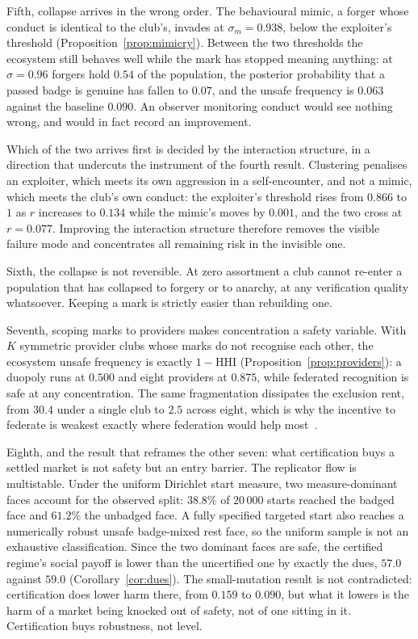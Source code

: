 \documentclass[11pt,a4paper]{article}
\theoremstyle{definition}
\begin{document}
Fifth, collapse arrives in the wrong order. The behavioural mimic, a forger
whose conduct is identical to the club's, invades at
$\sigma_m = 0.938$, below the exploiter's threshold
(Proposition~\ref{prop:mimicry}). Between the two thresholds the ecosystem
still behaves well while the mark has stopped meaning anything: at
$\sigma = 0.96$ forgers hold $0.54$ of the population, the posterior
probability that a passed badge is genuine has fallen to $0.07$, and the unsafe
frequency is $0.063$ against the baseline $0.090$. An observer monitoring
conduct would see nothing wrong, and would in fact record an improvement.

Which of the two arrives first is decided by the interaction structure, in a
direction that undercuts the instrument of the fourth result. Clustering
penalises an exploiter, which meets its own aggression in a self-encounter,
and not a mimic, which meets the club's own conduct: the exploiter's threshold
rises from $0.866$ to $1$ as $r$ increases to $0.134$ while the mimic's moves
by $0.001$, and the two cross at $r = 0.077$. Improving the interaction
structure therefore removes the visible failure mode and concentrates all
remaining risk in the invisible one.

Sixth, the collapse is not reversible. At zero assortment a club cannot
re-enter a population that has collapsed to forgery or to anarchy, at any
verification quality whatsoever. Keeping a mark is strictly easier than
rebuilding one.

Seventh, scoping marks to providers makes concentration a safety variable. With
$K$ symmetric provider clubs whose marks do not recognise each other, the
ecosystem unsafe frequency is exactly $1 - \mathrm{HHI}$
(Proposition~\ref{prop:providers}): a duopoly runs at $0.500$ and eight
providers at $0.875$, while federated recognition is safe at any
concentration. The same fragmentation dissipates the exclusion rent, from
$30.4$ under a single club to $2.5$ across eight, which is why the incentive to
federate is weakest exactly where federation would help
most~\citep{katz1985network}.

Eighth, and the result that reframes the other seven: what certification buys a
settled market is not safety but an entry barrier. The replicator flow is
multistable. Under the uniform Dirichlet start measure, two measure-dominant
faces account for the observed split: $38.8\%$ of $20\,000$ starts reached the
badged face and $61.2\%$ the unbadged face. A fully specified targeted start
also reaches a numerically robust unsafe badge-mixed rest face, so the uniform
sample is not an exhaustive classification. Since the two dominant faces are safe, the certified regime's
social payoff is
lower than the uncertified one by exactly the dues, $57.0$ against $59.0$
(Corollary~\ref{cor:dues}). The small-mutation result is not contradicted:
certification does lower harm there, from $0.159$ to $0.090$, but what it lowers
is the harm of a market being knocked out of safety, not of one sitting in it.
Certification buys robustness, not level.
\end{document}
